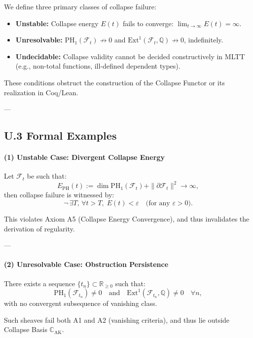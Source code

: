 \documentclass[11pt]{article}
\begin{document}
We define three primary classes of collapse failure:

\begin{itemize}
  \item \textbf{Unstable:} Collapse energy $E(t)$ fails to converge: $\lim_{t \to \infty} E(t) = \infty$.
  \item \textbf{Unresolvable:} $\mathrm{PH}_1(\mathcal{F}_t) \not\to 0$ and $\mathrm{Ext}^1(\mathcal{F}_t, \mathbb{Q}) \not\to 0$, indefinitely.
  \item \textbf{Undecidable:} Collapse validity cannot be decided constructively in MLTT (e.g., non-total functions, ill-defined dependent types).
\end{itemize}

These conditions obstruct the construction of the Collapse Functor or its realization in Coq/Lean.

---

\subsection*{U.3 Formal Examples}

\paragraph{(1) Unstable Case: Divergent Collapse Energy}

Let $\mathcal{F}_t$ be such that:
\[
E_{\mathrm{PH}}(t) := \dim \mathrm{PH}_1(\mathcal{F}_t) + \|\partial \mathcal{F}_t\|^2 \to \infty,
\]
then collapse failure is witnessed by:
\[
\neg\, \exists T,\, \forall t > T,\; E(t) < \varepsilon \quad \text{(for any } \varepsilon > 0).
\]

This violates Axiom A5 (Collapse Energy Convergence), and thus invalidates the derivation of regularity.

---

\paragraph{(2) Unresolvable Case: Obstruction Persistence}

There exists a sequence $\{t_n\} \subset \mathbb{R}_{\ge 0}$ such that:
\[
\mathrm{PH}_1(\mathcal{F}_{t_n}) \ne 0 \quad \text{and} \quad \mathrm{Ext}^1(\mathcal{F}_{t_n}, \mathbb{Q}) \ne 0 \quad \forall n,
\]
with no convergent subsequence of vanishing class.

Such sheaves fail both A1 and A2 (vanishing criteria), and thus lie outside Collapse Basis $\mathbb{C}_{\mathrm{AK}}$.
\end{document}
